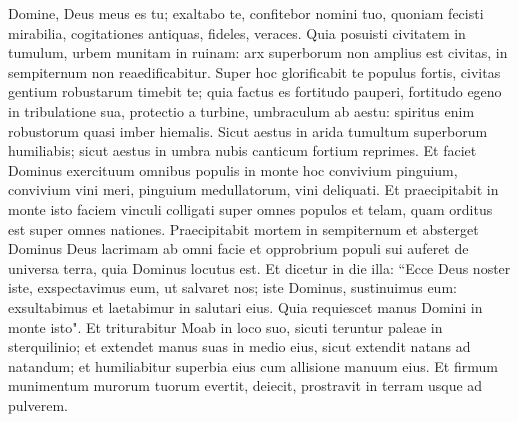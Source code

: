 \begin{biblechapter}  
\verse Domine, Deus meus es tu; exaltabo te, confitebor nomini tuo, quoniam fecisti mirabilia, cogitationes antiquas, fideles, veraces. 
\verse Quia posuisti civitatem in tumulum, urbem munitam in ruinam: arx superborum non amplius est civitas, in sempiternum non reaedificabitur. 
\verse Super hoc glorificabit te populus fortis, civitas gentium robustarum timebit te; 
\verse quia factus es fortitudo pauperi, fortitudo egeno in tribulatione sua, protectio a turbine, umbraculum ab aestu: spiritus enim robustorum quasi imber hiemalis. 
\verse Sicut aestus in arida tumultum superborum humiliabis; sicut aestus in umbra nubis canticum fortium reprimes. 
\verse Et faciet Dominus exercituum omnibus populis in monte hoc convivium pinguium, convivium vini meri, pinguium medullatorum, vini deliquati. 
\verse Et praecipitabit in monte isto faciem vinculi colligati super omnes populos et telam, quam orditus est super omnes nationes. 
\verse Praecipitabit mortem in sempiternum et absterget Dominus Deus lacrimam ab omni facie et opprobrium populi sui auferet de universa terra, quia Dominus locutus est. 
\verse Et dicetur in die illa: “Ecce Deus noster iste, exspectavimus eum, ut salvaret nos; iste Dominus, sustinuimus eum: exsultabimus et laetabimur in salutari eius. 
\verse Quia requiescet manus Domini in monte isto". Et triturabitur Moab in loco suo, sicuti teruntur paleae in sterquilinio; 
\verse et extendet manus suas in medio eius, sicut extendit natans ad natandum; et humiliabitur superbia eius cum allisione manuum eius. 
\verse Et firmum munimentum murorum tuorum evertit, deiecit, prostravit in terram usque ad pulverem. 
\end{biblechapter}

